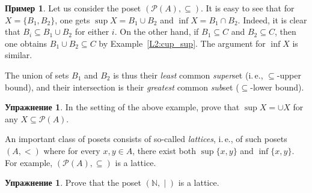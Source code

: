 \documentclass[12pt,notitlepage]{article}
\theoremstyle{plain}
\theoremstyle{definition}
\newtheorem{exc}[thm]{Упражнение}
\newtheorem{exm}[thm]{Пример}
\theoremstyle{plain}
\newcommand{\N}{\mathbb{N}}
\newcommand{\sbs}{\subseteq}
\newcommand{\void}{\varnothing}
\newcommand{\mP}{\mathcal{P}}
\newcommand{\1}{\mathbf{1}}
\newcommand{\0}{\mathbf{0}}
\newcommand{\dvd}{\mathop{\mid}}
\begin{document}
\begin{exm}
	
	Let us consider the poset $(\mP(A), {\sbs})$. It is easy to see that for $X = \{B_1, B_2\}$, one gets $\sup X = B_1 \cup B_2$ and $\inf X = B_1  \cap B_2$.
	Indeed, it is clear that $B_i \sbs B_1 \cup B_2$ for either $i$. On the other hand, if $B_1 \sbs C$ and $B_2 \sbs C$, then one obtains $B_1 \cup B_2 \sbs C$ by Example~\ref{L2:cup_sup}. The argument for $\inf X$ is similar.
	
	The union of sets $B_1$ and $B_2$ is thus their \emph{least} common \emph{super}set (i.\,e., ${\sbs}$-upper bound), and their intersection is their \emph{greatest} common \emph{sub}set (${\sbs}$-lower bound).
\end{exm}

\begin{exc}
	In the setting of the above example, prove that $\sup X = \cup X$ for any $X \sbs \mP(A)$.
\end{exc}

An important class of posets consists of so-called \emph{lattices}, i.\,e., of such posets $(A,{<})$ where for every $x, y \in A$, there exist both $\sup \{x, y\}$ and $\inf \{x, y\}$. For example, $(\mP(A), {\sbs})$ is a lattice.

\begin{exc}
	Prove that the poset $(\N,{\dvd})$ is a lattice.
\end{exc}
%
%
\end{document}
